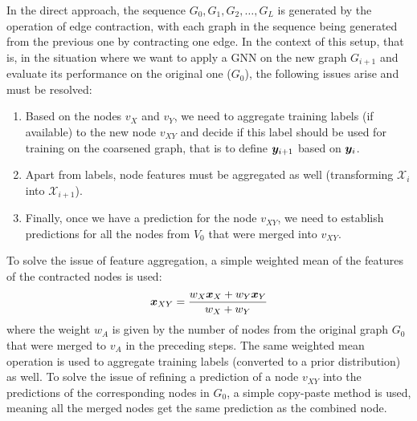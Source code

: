 In the direct approach, the sequence \( G_0, G_1, G_2, \dots, G_L \) is generated by the operation of edge contraction, with each graph in the sequence being generated from the previous one by contracting one edge. In the context of this setup, that is, in the situation where we want to apply a GNN on the new graph $G_{i+1}$ and evaluate its performance on the original one ($G_0$), the following issues arise and must be resolved:

\begin{enumerate}
	\item Based on the nodes $v_{X}$ and $v_{Y}$, we need to aggregate training labels (if available) to the new node $v_{XY}$ and decide if this label should be used for training on the coarsened graph, that is to define $\bm{y}_{i+1}$ based on $\bm{y}_i$.
	\item Apart from labels, node features must be aggregated as well (transforming $\mathcal{X}_i$ into $\mathcal{X}_{i+1}$).
	\item Finally, once we have a prediction for the node $v_{XY}$, we need to establish predictions for all the nodes from $V_0$ that were merged into $v_{XY}$.
\end{enumerate}

To solve the issue of feature aggregation, a simple weighted mean of the features of the contracted nodes is used:
\begin{equation}
	\bm{x}_{XY} = \frac{w_X \bm{x}_X+w_Y \bm{x}_Y}{w_X + w_Y}
\end{equation}
where the weight $w_A$ is given by the number of nodes from the original graph $G_0$ that were merged to $v_A$ in the preceding steps. The same weighted mean operation is used to aggregate training labels (converted to a prior distribution) as well. To solve the issue of refining a prediction of a node \( v_{XY} \) into the predictions of the corresponding nodes in \( G_0 \), a simple copy-paste method is used, meaning all the merged nodes get the same prediction as the combined node.

